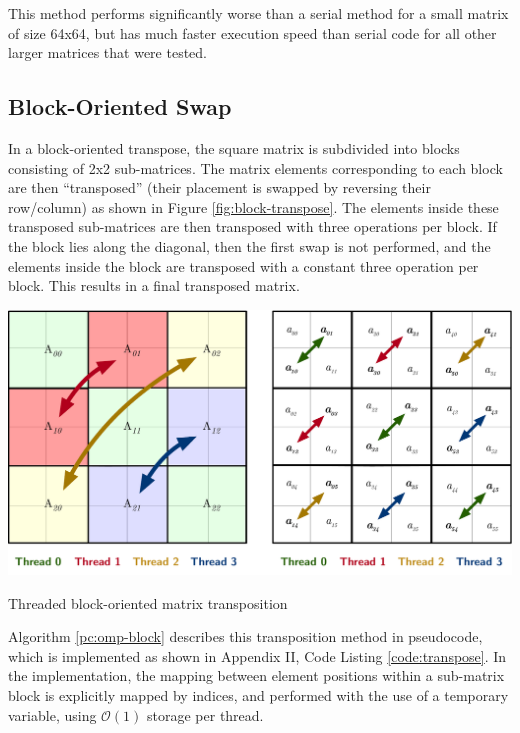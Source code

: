 \documentclass[10 pt, conference]{cssconf}
\begin{document}
\begin{multicols}{2}
This method performs significantly worse than a serial method for a small matrix of size 64x64, but has much faster execution speed than serial code for all other larger matrices that were tested.

\subsection{Block-Oriented Swap}
In a block-oriented transpose, the square matrix is subdivided into blocks consisting of 2x2 sub-matrices. The matrix elements corresponding to each  block are then ``transposed'' (their placement is swapped by reversing their row/column) as shown in Figure \ref{fig:block-transpose}. The elements inside these transposed sub-matrices are then transposed with three operations per block. If the block lies along the diagonal, then the first swap is not performed, and the elements inside the block are transposed with a constant three operation per block. This results in a final transposed matrix.  

\begin{Figure}
    \centering
    \vspace{10pt}
    {\includegraphics[width=1\linewidth]{images/block-oriented.pdf}}
    \caption{Threaded block-oriented matrix transposition}
    \label{fig:block-transpose} 
    \vspace{15pt}
\end{Figure}%

Algorithm \ref{pc:omp-block} describes this transposition method in pseudocode, which is implemented as shown in Appendix II, Code Listing \ref{code:transpose}. In the implementation, the mapping between element positions within a sub-matrix block is explicitly mapped by indices, and performed with the use of a temporary variable, using $\mathcal{O}(1)$ storage per thread.


\end{multicols}
\end{document}
